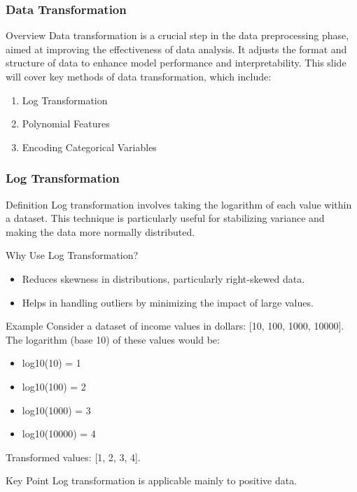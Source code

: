 \documentclass{beamer}
\begin{document}
\begin{frame}[fragile]
    \frametitle{Data Transformation}
    
    \begin{block}{Overview}
        Data transformation is a crucial step in the data preprocessing phase, aimed at improving the effectiveness of data analysis. It adjusts the format and structure of data to enhance model performance and interpretability. This slide will cover key methods of data transformation, which include:
    \end{block}

    \begin{enumerate}
        \item Log Transformation
        \item Polynomial Features
        \item Encoding Categorical Variables
    \end{enumerate}
\end{frame}

\begin{frame}[fragile]
    \frametitle{Log Transformation}
    
    \begin{block}{Definition}
        Log transformation involves taking the logarithm of each value within a dataset. This technique is particularly useful for stabilizing variance and making the data more normally distributed.
    \end{block}
    
    \begin{block}{Why Use Log Transformation?}
        \begin{itemize}
            \item Reduces skewness in distributions, particularly right-skewed data.
            \item Helps in handling outliers by minimizing the impact of large values.
        \end{itemize}
    \end{block}

    \begin{block}{Example}
        Consider a dataset of income values in dollars: [10, 100, 1000, 10000]. 
        The logarithm (base 10) of these values would be:
        \begin{itemize}
            \item log10(10) = 1
            \item log10(100) = 2
            \item log10(1000) = 3
            \item log10(10000) = 4
        \end{itemize}
        Transformed values: [1, 2, 3, 4].
    \end{block}

    \begin{block}{Key Point}
        Log transformation is applicable mainly to positive data.
    \end{block}
\end{frame}
\end{document}
